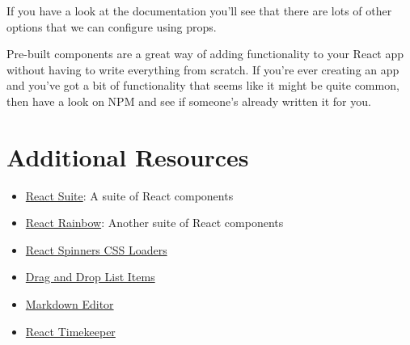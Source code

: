 If you have a look at the documentation you'll see that there are lots of other options that we can configure using props.

\hr

Pre-built components are a great way of adding functionality to your React app without having to write everything from scratch. If you're ever creating an app and you've got a bit of functionality that seems like it might be quite common, then have a look on NPM and see if someone's already written it for you.



\section{Additional Resources}

\begin{itemize}[leftmargin=*]
    \item \href{https://rsuitejs.com/en/}{React Suite}: A suite of React components
    \item \href{https://react-rainbow.web.app}{React Rainbow}: Another suite of React components
    \item \href{https://github.com/JoshK2/react-spinners-css}{React Spinners CSS Loaders}
    \item \href{https://github.com/atlassian/react-beautiful-dnd}{Drag and Drop List Items}
    \item \href{https://github.com/uiwjs/react-md-editor}{Markdown Editor}
    \item \href{https://catc.github.io/react-timekeeper/}{React Timekeeper}
\end{itemize}
